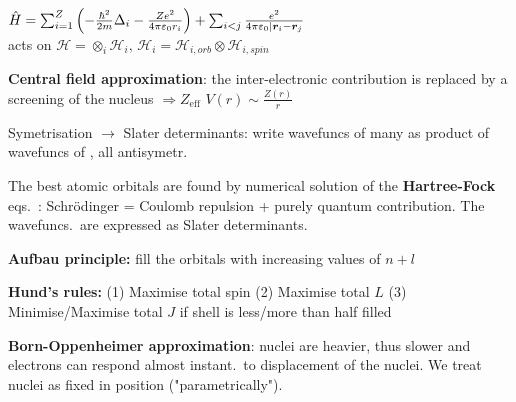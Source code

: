 \begin{squishlist}
    \item $\hat{H} = \sum_{i=1}^{Z}\left( - \frac{\hbar^2}{2m}\Delta_i - \frac{Ze^2}{4\pi \varepsilon_0 r_i}\right) + \sum_{i < j} \frac{e^2}{4\pi \varepsilon_0 |\bm{r}_i - \bm{r}_j}$ \\
    acts on $\mathcal{H} = \otimes_i \mathcal{H}_i,\, \mathcal{H}_i =  \mathcal{H}_{i, orb} \otimes \mathcal{H}_{i, spin}$
    \item \textbf{Central field approximation}: the inter-electronic contribution is replaced by a screening of the nucleus $\Rightarrow Z_{\mathrm{eff}}$ \quad $V(r) \sim \frac{Z(r)}{r}$
    \item Symetrisation $\rightarrow$ Slater determinants: write wavefuncs of many \elec as product of wavefuncs of \elec, all antisymetr.
    \item The best atomic orbitals are found by numerical solution of the \textbf{Hartree-Fock} eqs.\ : Schrödinger = Coulomb repulsion + purely quantum contribution.
    The wavefuncs.\ are expressed as Slater determinants.

    \item \textbf{Aufbau principle:} fill the orbitals with increasing values of $n+l$
    \item \textbf{Hund's rules:} (1) Maximise total spin (2) Maximise total $L$ (3) Minimise/Maximise total $J$ if shell is less/more than half filled
\end{squishlist}

\textbf{Born-Oppenheimer approximation}: nuclei are heavier, thus slower and electrons can respond almost instant.\ to displacement of the nuclei. We treat nuclei as fixed in position ("parametrically").

\squishline

